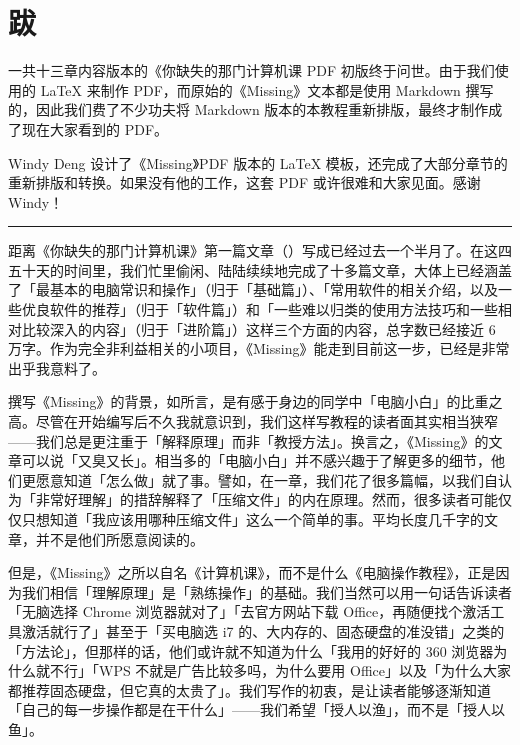 \chapter{跋}
\label{afterwords}

一共十三章内容版本的《你缺失的那门计算机课 PDF 初版终于问世。由于我们使用的 \LaTeX{} 来制作 PDF，而原始的《Missing》文本都是使用 Markdown 撰写的，因此我们费了不少功夫将 Markdown 版本的本教程重新排版，最终才制作成了现在大家看到的 PDF。

Windy Deng 设计了《Missing》PDF 版本的 \LaTeX{} 模板，还完成了大部分章节的重新排版和转换。如果没有他的工作，这套 PDF 或许很难和大家见面。感谢 Windy！


\begin{center}\rule{0.5\linewidth}{0.5pt}\end{center}

距离《你缺失的那门计算机课》第一篇文章（）写成已经过去一个半月了。在这四五十天的时间里，我们忙里偷闲、陆陆续续地完成了十多篇文章，大体上已经涵盖了「最基本的电脑常识和操作」（归于「基础篇」）、「常用软件的相关介绍，以及一些优良软件的推荐」（归于「软件篇」）和「一些难以归类的使用方法技巧和一些相对比较深入的内容」（归于「进阶篇」）这样三个方面的内容，总字数已经接近 6 万字。作为完全非利益相关的小项目，《Missing》能走到目前这一步，已经是非常出乎我意料了。

撰写《Missing》的背景，如所言，是有感于身边的同学中「电脑小白」的比重之高。尽管在开始编写后不久我就意识到，我们这样写教程的读者面其实相当狭窄——我们总是更注重于「解释原理」而非「教授方法」。换言之，《Missing》的文章可以说「又臭又长」。相当多的「电脑小白」并不感兴趣于了解更多的细节，他们更愿意知道「怎么做」就了事。譬如，在一章，我们花了很多篇幅，以我们自认为「非常好理解」的措辞解释了「压缩文件」的内在原理。然而，很多读者可能仅仅只想知道「我应该用哪种压缩文件」这么一个简单的事。平均长度几千字的文章，并不是他们所愿意阅读的。

但是，《Missing》之所以自名《计算机课》，而不是什么《电脑操作教程》，正是因为我们相信「理解原理」是「熟练操作」的基础。我们当然可以用一句话告诉读者「无脑选择 Chrome 浏览器就对了」「去官方网站下载 Office，再随便找个激活工具激活就行了」甚至于「买电脑选 i7 的、大内存的、固态硬盘的准没错」之类的「方法论」，但那样的话，他们或许就不知道为什么「我用的好好的 360 浏览器为什么就不行」「WPS 不就是广告比较多吗，为什么要用 Office」以及「为什么大家都推荐固态硬盘，但它真的太贵了」。我们写作的初衷，是让读者能够逐渐知道「自己的每一步操作都是在干什么」——我们希望「授人以渔」，而不是「授人以鱼」。

